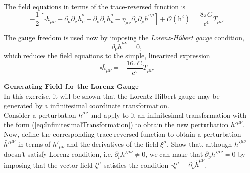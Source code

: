 The field equations in terms of the trace-reversed function is 
\begin{equation}
-\frac{1}{2} \left[ \square \bar{h}_{\mu \nu} - \partial _\mu \partial _\sigma \bar{h}^\sigma _\nu - \partial _\sigma \partial _\nu \bar{h}^\sigma _\mu - \eta_{\mu \nu} \partial _\sigma \partial _\rho \bar{h}^{\sigma \rho}  \right] + \mathcal{O} ( \textrm{h}^2 ) = \frac{8\pi G}{c^4} T_{\mu \nu} . \label{eq:LinearizedFieldEquations2}
\end{equation}

The gauge freedom is used now by imposing the \textit{Lorenz-Hilbert gauge} condition,
\begin{equation}
\partial_\nu \bar{h}^{\mu \nu} = 0, \label{eq:LorenzGauge}
\end{equation}
which reduces the field equations to the simple, linearized  expression
\begin{equation}
\square \bar{h}_{\mu \nu}  = - \frac{16 \pi G}{c^4} T_{\mu \nu} . \label{eq:LinearizedWaveFieldEquations}
\end{equation}

\begin{exercise}
\textbf{Generating Field for the Lorenz Gauge}\\

In this exercise, it will be shown that the Lorentz-Hilbert gauge may be generated by a infinitesimal coordinate transformation. \\

Consider a perturbation $h^{\mu \nu}$ and apply to it an infinitesimal transformation with the form (\ref{eq:InfinitesimalTransformation}) to obtain the new perturbation $h'^{\mu \nu}$. Now, define the corresponding trace-reversed function to obtain a perturbation $\bar{h}'^{\mu \nu}$ in terms of $h'_{\mu \nu}$ and the derivatives of the field $\xi^\mu$.  Show that, although  $h'^{\mu \nu}$  doesn't satisfy Lorenz condition, i.e. $\partial_\nu h'^{\mu \nu}\neq 0$,   we can make that $\partial_\nu \bar{h}'^{\mu \nu}= 0$ by imposing that the vector field $\xi^\mu$ satisfies the condition $\square \xi^\mu = \partial_\nu \tilde{h}^{\mu \nu}$.
\end{exercise}

